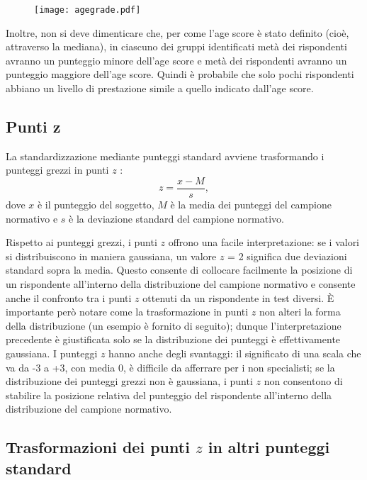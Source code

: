 \begin{figure}
\begin{center}
\texttt{[image: agegrade.pdf]}
\end{center}
\end{figure}

Inoltre, non si deve dimenticare che, per come l'age score è stato definito (cioè, attraverso la mediana), in ciascuno dei gruppi identificati metà dei rispondenti avranno un punteggio minore dell'age score e metà dei rispondenti avranno un punteggio maggiore dell'age score.
  Quindi è probabile che solo pochi rispondenti abbiano un livello di prestazione simile a quello indicato dall'age score.

\subsection{Punti z}

La standardizzazione mediante punteggi standard avviene trasformando i punteggi grezzi in punti $z$ :
\[
z = \frac{x-M}{s},
\]
dove $x$ è il punteggio del soggetto, $M$ è la media dei punteggi del campione normativo e $s$ è la deviazione standard del campione normativo. 

Rispetto ai punteggi grezzi, i punti $z$ offrono una facile interpretazione: se i valori si distribuiscono in maniera gaussiana, un valore $z$ = 2 significa due deviazioni standard sopra la media.
  Questo consente di collocare facilmente la posizione di un rispondente all'interno della distribuzione del campione normativo e consente anche il confronto tra i punti $z$ ottenuti da un rispondente in test diversi.
  È importante però notare come la trasformazione in punti $z$ non alteri la forma della distribuzione (un esempio è fornito di seguito); dunque l'interpretazione precedente è giustificata solo se la distribuzione dei punteggi è effettivamente gaussiana.
I punteggi $z$ hanno anche degli svantaggi:
il significato di una scala che va da -3 a +3, con media 0, è difficile da afferrare per i non specialisti;
se la distribuzione dei punteggi grezzi non è gaussiana, i punti $z$ non consentono di stabilire la posizione relativa del punteggio del rispondente all'interno della distribuzione del campione normativo.


\subsection{Trasformazioni dei punti $z$ in altri punteggi standard}

